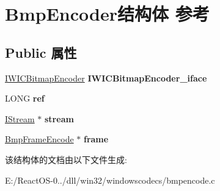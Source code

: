 \hypertarget{struct_bmp_encoder}{}\section{Bmp\+Encoder结构体 参考}
\label{struct_bmp_encoder}
\subsection*{Public 属性}
\begin{DoxyCompactItemize}
\item 
\mbox{\label{struct_bmp_encoder_af110711b38b1e35672121dd6b138410c}} 
\hyperlink{interface_i_w_i_c_bitmap_encoder}{I\+W\+I\+C\+Bitmap\+Encoder} {\bfseries I\+W\+I\+C\+Bitmap\+Encoder\+\_\+iface}
\item 
\mbox{\label{struct_bmp_encoder_a130a49efde841f83bd96242f3e736e77}} 
L\+O\+NG {\bfseries ref}
\item 
\mbox{\label{struct_bmp_encoder_a15a3c96311ad942e65b8796a9654a29b}} 
\hyperlink{interface_i_stream}{I\+Stream} $\ast$ {\bfseries stream}
\item 
\mbox{\label{struct_bmp_encoder_a5c8a87fc6c784a8ec5eec43174acf523}} 
\hyperlink{struct_bmp_frame_encode}{Bmp\+Frame\+Encode} $\ast$ {\bfseries frame}
\end{DoxyCompactItemize}


该结构体的文档由以下文件生成\+:\begin{DoxyCompactItemize}
\item 
E\+:/\+React\+O\+S-\/0../dll/win32/windowscodecs/bmpencode.\+c\end{DoxyCompactItemize}
